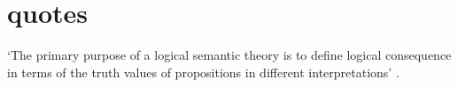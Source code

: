 \documentclass[]{article}
\begin{document}

\section{quotes}

`The primary purpose of a logical semantic theory is to define logical consequence in terms of the truth values of propositions in different interpretations' \autocite[79]{Klima1991b}. 
\end{document}
